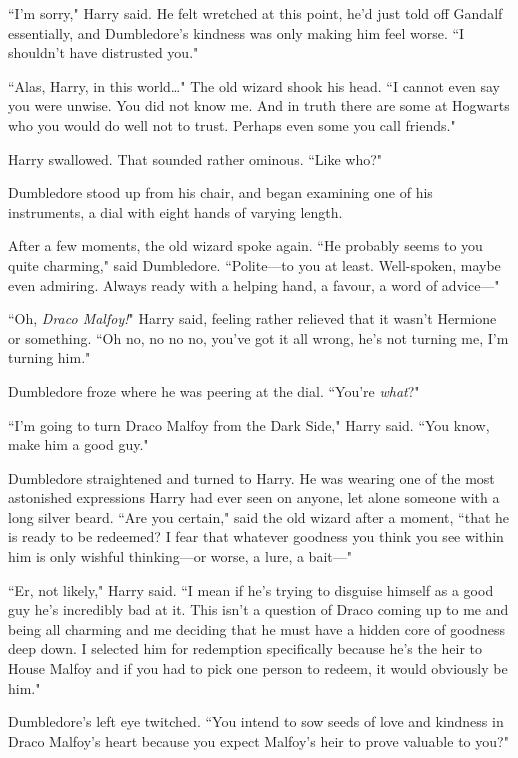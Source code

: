 ``I'm sorry," Harry said. He felt wretched at this point, he'd just told off Gandalf essentially, and Dumbledore's kindness was only making him feel worse. ``I shouldn't have distrusted you."

``Alas, Harry, in this world…" The old wizard shook his head. ``I cannot even say you were unwise. You did not know me. And in truth there are some at Hogwarts who you would do well not to trust. Perhaps even some you call friends."

Harry swallowed. That sounded rather ominous. ``Like who?"

Dumbledore stood up from his chair, and began examining one of his instruments, a dial with eight hands of varying length.

After a few moments, the old wizard spoke again. ``He probably seems to you quite charming," said Dumbledore. ``Polite—to you at least. Well-spoken, maybe even admiring. Always ready with a helping hand, a favour, a word of advice—"

``Oh, \emph{Draco Malfoy!}" Harry said, feeling rather relieved that it wasn't Hermione or something. ``Oh no, no no no, you've got it all wrong, he's not turning me, I'm turning him."

Dumbledore froze where he was peering at the dial. ``You're \emph{what}?"

``I'm going to turn Draco Malfoy from the Dark Side," Harry said. ``You know, make him a good guy."

Dumbledore straightened and turned to Harry. He was wearing one of the most astonished expressions Harry had ever seen on anyone, let alone someone with a long silver beard. ``Are you certain," said the old wizard after a moment, ``that he is ready to be redeemed? I fear that whatever goodness you think you see within him is only wishful thinking—or worse, a lure, a bait—"

``Er, not likely," Harry said. ``I mean if he's trying to disguise himself as a good guy he's incredibly bad at it. This isn't a question of Draco coming up to me and being all charming and me deciding that he must have a hidden core of goodness deep down. I selected him for redemption specifically because he's the heir to House Malfoy and if you had to pick one person to redeem, it would obviously be him."

Dumbledore's left eye twitched. ``You intend to sow seeds of love and kindness in Draco Malfoy's heart because you expect Malfoy's heir to prove valuable to you?"

